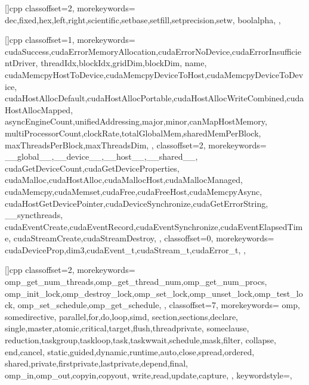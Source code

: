 []{cpp}{
  classoffset=2,
  morekeywords={
    dec,fixed,hex,left,right,scientific,setbase,setfill,setprecision,setw,
    boolalpha,
  },
}

[]{cpp}{
  classoffset=1,
  morekeywords={
    cudaSuccess,cudaErrorMemoryAllocation,cudaErrorNoDevice,cudaErrorInsufficientDriver,
    threadIdx,blockIdx,gridDim,blockDim,
    name,
    cudaMemcpyHostToDevice,cudaMemcpyDeviceToHost,cudaMemcpyDeviceToDevice,
    cudaHostAllocDefault,cudaHostAllocPortable,cudaHostAllocWriteCombined,cudaHostAllocMapped,
    asyncEngineCount,unifiedAddressing,major,minor,canMapHostMemory,
    multiProcessorCount,clockRate,totalGlobalMem,sharedMemPerBlock,
    maxThreadsPerBlock,maxThreadsDim,
  },
  classoffset=2,
  morekeywords={
    __global__,__device__,__host__,__shared__,
    cudaGetDeviceCount,cudaGetDeviceProperties,
    cudaMalloc,cudaHostAlloc,cudaMallocHost,cudaMallocManaged,
    cudaMemcpy,cudaMemset,cudaFree,cudaFreeHost,cudaMemcpyAsync,
    cudaHostGetDevicePointer,cudaDeviceSynchronize,cudaGetErrorString,
    __syncthreads,
    cudaEventCreate,cudaEventRecord,cudaEventSynchronize,cudaEventElapsedTime,
    cudaStreamCreate,cudaStreamDestroy,
  },
  classoffset=0,
  morekeywords={
    cudaDeviceProp,dim3,cudaEvent_t,cudaStream_t,cudaError_t,
  },
}

[]{cpp}{
  classoffset=2,
  morekeywords={
    omp_get_num_threads,omp_get_thread_num,omp_get_num_procs,
    omp_init_lock,omp_destroy_lock,omp_set_lock,omp_unset_lock,omp_test_lock,
    omp_set_schedule,omp_get_schedule,
  },
  classoffset=7,
  morekeywords={
    omp,
    somedirective,
    parallel,for,do,loop,simd,
    section,sections,declare,
    single,master,atomic,critical,target,flush,threadprivate,
    someclause,
    reduction,taskgroup,taskloop,task,taskwwait,schedule,mask,filter,
    collapse,
    end,cancel,
    static,guided,dynamic,runtime,auto,close,spread,ordered,
    shared,private,firstprivate,lastprivate,depend,final,
    omp_in,omp_out,copyin,copyout,
    write,read,update,capture,
  },
  keywordstyle=\rmfamily\color{arsenic},
}


